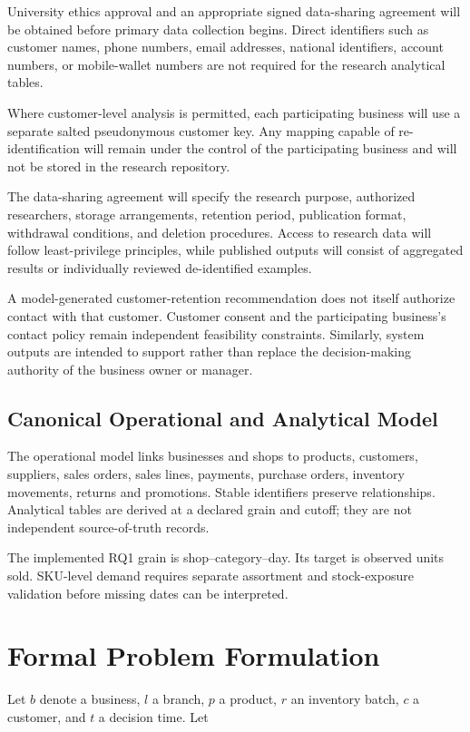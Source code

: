 \documentclass[a4paper,11pt,oneside]{book}
\theoremstyle{plain}
\theoremstyle{definition}
\theoremstyle{remark}
\begin{document}
University ethics approval and an appropriate signed data-sharing agreement will
be obtained before primary data collection begins. Direct identifiers such as
customer names, phone numbers, email addresses, national identifiers, account
numbers, or mobile-wallet numbers are not required for the research analytical
tables.

Where customer-level analysis is permitted, each participating business will use
a separate salted pseudonymous customer key. Any mapping capable of
re-identification will remain under the control of the participating business
and will not be stored in the research repository.

The data-sharing agreement will specify the research purpose, authorized
researchers, storage arrangements, retention period, publication format,
withdrawal conditions, and deletion procedures. Access to research data will
follow least-privilege principles, while published outputs will consist of
aggregated results or individually reviewed de-identified examples.

A model-generated customer-retention recommendation does not itself authorize
contact with that customer. Customer consent and the participating business's
contact policy remain independent feasibility constraints. Similarly, system
outputs are intended to support rather than replace the decision-making authority
of the business owner or manager.


\subsection{Canonical Operational and Analytical Model}
The operational model links businesses and shops to products, customers,
suppliers, sales orders, sales lines, payments, purchase orders, inventory
movements, returns and promotions. Stable identifiers preserve relationships.
Analytical tables are derived at a declared grain and cutoff; they are not
independent source-of-truth records.

The implemented RQ1 grain is shop--category--day. Its target is observed
units sold. SKU-level demand requires separate assortment and stock-exposure
validation before missing dates can be interpreted.

\section{Formal Problem Formulation}
\label{sec:formal_problem_formulation}

Let \(b\) denote a business, \(l\) a branch, \(p\) a product, \(r\) an
inventory batch, \(c\) a customer, and \(t\) a decision time. Let
\end{document}
